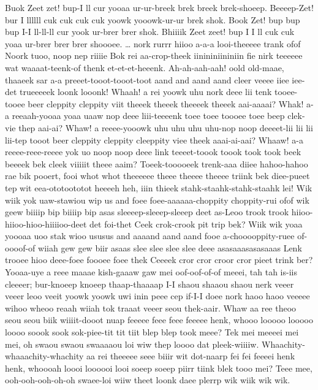 \documentclass[12pt,a4paper]{article}
\begin{document}
\begin{drama}
\pistspeaks
Buok Zeet zet! bup-I ll cur yooaa ur-ur-breek brek breek brek-shoeep. Beeeep-Zet! bur I llllll cuk cuk cuk cuk yoowk yooowk-ur-ur brek shok. Book Zet! bup bup bup I-I ll-ll-ll cur yook ur-brer brer shok. Bhiiiik Zeet zeet! bup I I ll cuk cuk yoaa ur-brer brer brer shoooee.
\cinespeaks
… nork rurrr hiioo a-a-a looi-theeeee trank ofof Noork tuoo, noop nep riiiie Bok rei aa-crop-theek iinininiininiin fie nirk teeeeee wat waaaat-teenk-of thenk et-et-et-heeenk.  Ah-ah-aah-aah! oold old-maae, thaaeek sar a-a preeet-tooot-tooot-toot aand and aand aand cleer veeee iiee iee-det trueeeeek loonk looonk!
\pistspeaks
Whaah! a rei yoowk uhu nork deee lii tenk tooee-tooee beer cleppity cleppity viit theeek theeek theeeek theeek aai-aaaai? Whak! a-a reeaah-yooaa yoaa uaaw nop deee liii-teeeenk toee toee toooee toee beep clek-vie thep aai-ai? Whaw! a reeee-yooowk uhu uhu uhu uhu-nop noop deeeet-lii lii lii lii-tep tooot beer cleppity cleppity cleeppity viee theek aaai-ai-aai? Whaaw! a-a reeee-reee-reeee yok uo noop noop deee link teeeet-toook toook took took beek beeeek bek cleek viiiiit theee aaim?
\cinespeaks
Toeek-tooooeek trenk-aaa diiee hahoo-hahoo rae bik pooert, fooi whot whot theeeeee theee theeee theeee triink bek diee-pueet tep wit eea-ototoototot heeeeh heh, iiin thieek stahk-staahk-stahk-staahk lei!
\pistspeaks
Wik wiik yok uaw-stawiou wip us and foee foee-aaaaaa-choppity choppity-rui ofof wik geew biiiip bip biiiip bip asas sleeeep-sleeep-sleeep deet as-Leoo trook trook hiioo-hiioo-hioo-hiiiioo-deet det foi-thet Ceek crok-crook pit trip bek? Wiik wik yoaa yoooaa uoo stak wioo ususus and aaaand aand aand fooe a-chooooppity-ruee of-oooof-of wiiah gew gew biir asaas slee slee slee slee deee asasaaasasasaaas Lenk trooee hioo deee-foee foooee foee thek Ceeeek cror cror croor cror pieet trink ber?
\cinespeaks
Yooaa-uye a reee maaae kish-gaaaw gaw mei oof-oof-of-of meeei, tah tah is-iis cleeeer; bur-knoeep knoeep thaap-thaaaap I-I shaou shaaou shaou nerk veeer veeer leoo veeit yoowk yoowk uwi inin peee cep if-I-I doee nork haoo haoo veeeee wihoo wheoo reaah wiiah tok traaat veeer seou thek-aair.
\aninspeaks
Whaw aa ree theoo seou seou biik wiiiit-dooot nuap feeeee feee feee feeeee henk, whooo looooo looooo loooo soook sook sok-piee-tit tit tiit blep blep took meee? Tek mei meeeei mei mei, oh swaou swaou swaaaaou loi wiw thep loooo dat pleek-wiiiiw. Whaachity-whaaachity-whachity aa rei theeeee seee biiir wit dot-naarp fei fei feeeei henk henk, whoooah loooi loooooi looi soeep soeep piirr tiink blek tooo mei? Teee mee, ooh-ooh-ooh-oh-oh swaee-loi wiiw theet loonk daee plerrp wik wiik wik wik.

\end{drama}
\end{document}
